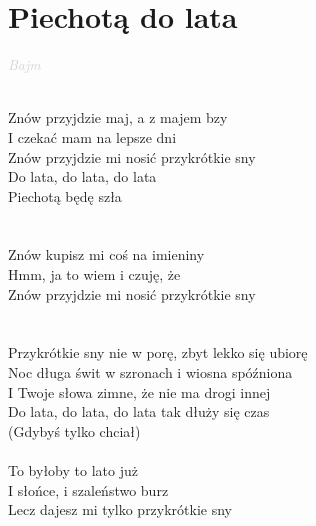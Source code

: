\documentclass[a5paper, 10pt]{book}
\begin{document}
\section{Piechotą do lata}\textcolor{lightgray}{\textit{Bajm}}\\~\\
\begin{minipage}[t]{0.7\textwidth}
  Znów przyjdzie maj, a z majem bzy\\
  I czekać mam na lepsze dni\\
  Znów przyjdzie mi nosić przykrótkie sny\\

  \hspace*{6mm}Do lata, do lata, do lata\\
  \hspace*{6mm}Piechotą będę szła\\
  \\
  \\
  Znów kupisz mi coś na imieniny\\
  Hmm, ja to wiem i czuję, że\\
  Znów przyjdzie mi nosić przykrótkie sny\\
  \\
  \\
  \hspace*{2mm}Przykrótkie sny nie w porę, zbyt lekko się ubiorę\\
  \hspace*{2mm}Noc długa świt w szronach i wiosna spóźniona\\
  \hspace*{2mm}I Twoje słowa zimne, że nie ma drogi innej\\
  \hspace*{2mm}Do lata, do lata, do lata tak dłuży się czas\\
  \hspace*{2mm}(Gdybyś tylko chciał)\\
  \\
  To byłoby to lato już\\
  I słońce, i szaleństwo burz\\
  Lecz dajesz mi tylko przykrótkie sny\\
\end{minipage}
\end{document}
